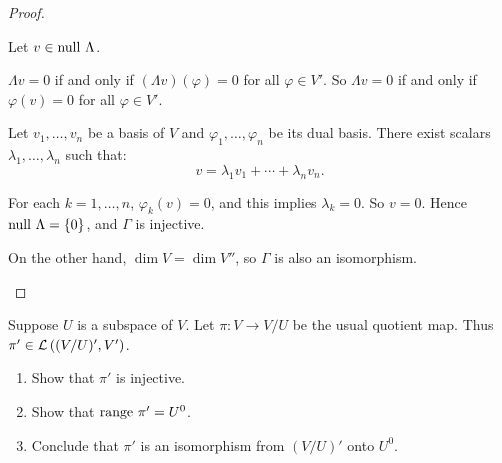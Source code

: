 \begin{proof}
\begin{enumerate}[label={(\alph*)}]
              Let $v\in \operatorname{null}\,{\Lambda}$.

              $\Lambda v = 0$ if and only if $(\Lambda v)(\varphi) = 0$ for all $\varphi\in V'$. So $\Lambda v = 0$ if and only if $\varphi(v) = 0$ for all $\varphi\in V'$.

              Let $v_{1}, \ldots, v_{n}$ be a basis of $V$ and $\varphi_{1}, \ldots, \varphi_{n}$ be its dual basis. There exist scalars $\lambda_{1}, \ldots, \lambda_{n}$ such that:
              \[
                  v = \lambda_{1}v_{1} + \cdots + \lambda_{n}v_{n}.
              \]

              For each $k = 1,\ldots, n$, $\varphi_{k}(v) = 0$, and this implies $\lambda_{k} = 0$. So $v = 0$. Hence $\operatorname{null}\,{\Lambda} = \{0\}$, and $\Gamma$ is injective.

              On the other hand, $\dim V = \dim V''$, so $\Gamma$ is also an isomorphism.
    \end{enumerate}
\end{proof}
\newpage

\begin{exercise}
    Suppose $U$ is a subspace of $V$. Let $\pi: V\to V/U$ be the usual quotient map. Thus $\pi'\in \mathcal{L}\left({(V/U)', V'}\right)$.
    \begin{enumerate}[label={(\alph*)}]
        \item Show that $\pi'$ is injective.
        \item Show that $\operatorname{range}\,{\pi}' = U^{0}$.
        \item Conclude that $\pi'$ is an isomorphism from ${(V/U)}'$ onto $U^{0}$.
    \end{enumerate}
\end{exercise}

